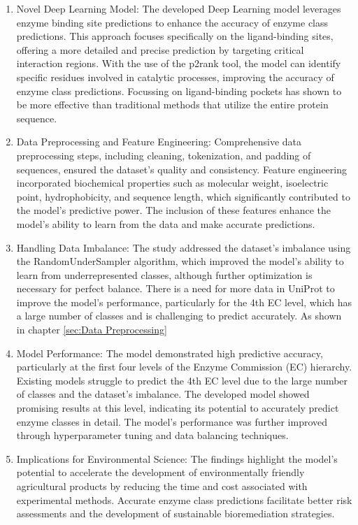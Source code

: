 \begin{enumerate}
    \item Novel Deep Learning Model: The developed Deep Learning model leverages enzyme binding site predictions to enhance the accuracy of enzyme class predictions. This approach focuses specifically on the ligand-binding sites, offering a more detailed and precise prediction by targeting critical interaction regions. With the use of the p2rank tool, the model can identify specific residues involved in catalytic processes, improving the accuracy of enzyme class predictions. Focussing on ligand-binding pockets has shown to be more effective than traditional methods that utilize the entire protein sequence.
    \item Data Preprocessing and Feature Engineering: Comprehensive data preprocessing steps, including cleaning, tokenization, and padding of sequences, ensured the dataset's quality and consistency. Feature engineering incorporated biochemical properties such as molecular weight, isoelectric point, hydrophobicity, and sequence length, which significantly contributed to the model's predictive power. The inclusion of these features enhance the model's ability to learn from the data and make accurate predictions.
    \item Handling Data Imbalance: The study addressed the dataset's imbalance using the RandomUnderSampler algorithm, which improved the model's ability to learn from underrepresented classes, although further optimization is necessary for perfect balance. There is a need for more data in UniProt to improve the model's performance, particularly for the 4th EC level, which has a large number of classes and is challenging to predict accurately. As shown in chapter \ref{sec:Data Preprocessing}
    \item Model Performance: The model demonstrated high predictive accuracy, particularly at the first four levels of the Enzyme Commission (EC) hierarchy. Existing models struggle to predict the 4th EC level due to the large number of classes and the dataset's imbalance. The developed model showed promising results at this level, indicating its potential to accurately predict enzyme classes in detail. The model's performance was further improved through hyperparameter tuning and data balancing techniques.
    \item Implications for Environmental Science: The findings highlight the model's potential to accelerate the development of environmentally friendly agricultural products by reducing the time and cost associated with experimental methods. Accurate enzyme class predictions facilitate better risk assessments and the development of sustainable bioremediation strategies.
\end{enumerate}

